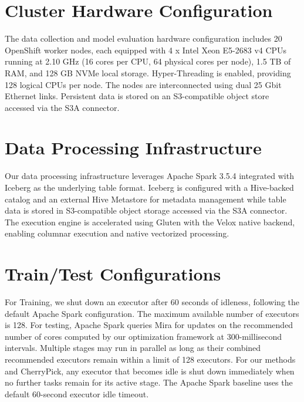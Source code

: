 
\section{Cluster Hardware Configuration}

The data collection and model evaluation hardware configuration includes 20 OpenShift worker nodes, each equipped with 4 x Intel Xeon E5-2683 v4 CPUs running at 2.10 GHz (16 cores per CPU, 64 physical cores per node), 1.5 TB of RAM, and 128 GB NVMe local storage. Hyper-Threading is enabled, providing 128 logical CPUs per node. The nodes are interconnected using dual 25 Gbit Ethernet links. Persistent data is stored on an S3-compatible object store accessed via the S3A connector.

\section{Data Processing Infrastructure}

Our data processing infrastructure leverages Apache Spark 3.5.4 integrated with Iceberg as the underlying table format. Iceberg is configured with a Hive-backed catalog and an external Hive Metastore for metadata management while table data is stored in S3-compatible object storage accessed via the S3A connector. The execution engine is accelerated using Gluten with the Velox native backend, enabling columnar execution and native vectorized processing.

\section{Train/Test Configurations}

For Training, we shut down an executor after 60 seconds of idleness, following the default Apache Spark configuration. The maximum available number of executors is 128. For testing, Apache Spark queries Mira for updates on the recommended number of cores computed by our optimization framework at 300-millisecond intervals. Multiple stages may run in parallel as long as their combined recommended executors remain within a limit of 128 executors. For our methods and CherryPick, any executor that becomes idle is shut down immediately when no further tasks remain for its active stage. The Apache Spark baseline uses the default 60-second executor idle timeout.

